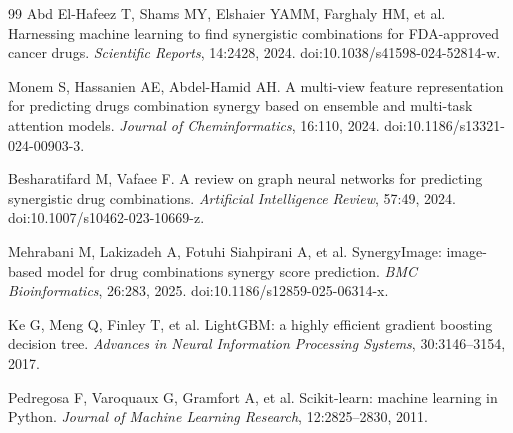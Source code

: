 \documentclass[11pt]{article}
\begin{document}
\begin{thebibliography}{99}
 Abd El-Hafeez T, Shams MY, Elshaier YAMM, Farghaly HM, et al.
Harnessing machine learning to find synergistic combinations for FDA-approved cancer drugs.
\textit{Scientific Reports}, 14:2428, 2024. doi:10.1038/s41598-024-52814-w.

 Monem S, Hassanien AE, Abdel-Hamid AH.
A multi-view feature representation for predicting drugs combination synergy based on ensemble and
multi-task attention models. \textit{Journal of Cheminformatics}, 16:110, 2024.
doi:10.1186/s13321-024-00903-3.

 Besharatifard M, Vafaee F.
A review on graph neural networks for predicting synergistic drug combinations.
\textit{Artificial Intelligence Review}, 57:49, 2024. doi:10.1007/s10462-023-10669-z.

 Mehrabani M, Lakizadeh A, Fotuhi Siahpirani A, et al.
SynergyImage: image-based model for drug combinations synergy score prediction.
\textit{BMC Bioinformatics}, 26:283, 2025. doi:10.1186/s12859-025-06314-x.

 Ke G, Meng Q, Finley T, et al.
LightGBM: a highly efficient gradient boosting decision tree.
\textit{Advances in Neural Information Processing Systems}, 30:3146--3154, 2017.

 Pedregosa F, Varoquaux G, Gramfort A, et al.
Scikit-learn: machine learning in Python.
\textit{Journal of Machine Learning Research}, 12:2825--2830, 2011.
\end{thebibliography}
\end{document}
